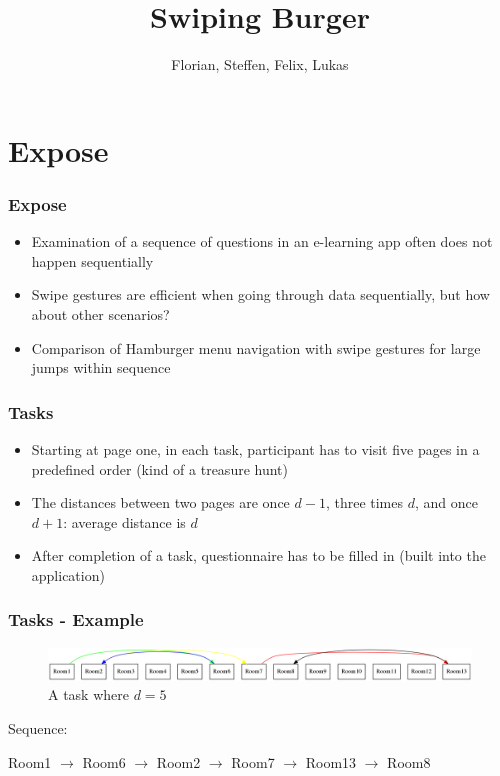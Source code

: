 \documentclass{beamer}
\begin{document}

\title{Swiping Burger}
\author{Florian, Steffen, Felix, Lukas}

\frame{\maketitle}

\section{Expose}
\begin{frame}
        \frametitle{Expose}
		\begin{itemize}
		  \item Examination of a sequence of questions in an e-learning app often does not happen sequentially
		  \item Swipe gestures are efficient when going through data sequentially, but how about other scenarios?
		  \item Comparison of Hamburger menu navigation with swipe gestures for large jumps within sequence
		\end{itemize}
\end{frame}

\begin{frame}
        \frametitle{Tasks}
		\begin{itemize}
		  \item Starting at page one, in each task, participant has to visit five pages in a predefined order (kind of a treasure hunt)
		  \item The distances between two pages are once $d - 1$, three times $d$, and once $d + 1$: average distance is $d$
		  \item After completion of a task, questionnaire has to be filled in (built into the application)
		\end{itemize}
\end{frame}

\begin{frame}
        \frametitle{Tasks - Example}
        
        
   		\begin{figure}
		\includegraphics[width=\textwidth]{distance_5.png}
		\caption{A task where $d = 5$}
		\end{figure}
		
		Sequence:
		
		Room1 $\rightarrow$ Room6 $\rightarrow$ Room2 $\rightarrow$ Room7 $\rightarrow$ Room13 $\rightarrow$ Room8

		
\end{frame}
\end{document}
